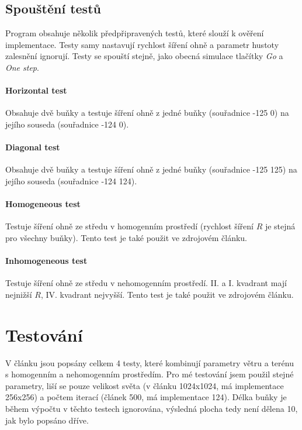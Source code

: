 \documentclass[11pt,a4paper]{scrartcl}
\begin{document}
	\subsection{Spouštění testů}
	Program obsahuje několik předpřipravených testů, které slouží k ověření implementace. Testy samy nastavují rychlost šíření ohně a parametr hustoty zalesnění ignorují. Testy se spouští stejně, jako obecná simulace tlačítky \textit{Go} a \textit{One step}.
	
	\paragraph{Horizontal test}
	Obsahuje dvě buňky a testuje šíření ohně z jedné buňky (souřadnice -125 0) na jejího souseda (souřadnice -124 0).
	
	\paragraph{Diagonal test}
	Obsahuje dvě buňky a testuje šíření ohně z jedné buňky (souřadnice -125 125) na jejího souseda (souřadnice -124 124).
	
	\paragraph{Homogeneous test}
	Testuje šíření ohně ze středu v homogenním prostředí (rychlost šíření $R$ je stejná pro všechny buňky). Tento test je také použit ve zdrojovém článku.
	
	\paragraph{Inhomogeneous test}
	Testuje šíření ohně ze středu v nehomogenním prostředí. II. a I. kvadrant mají nejnižší $R$, IV. kvadrant nejvyšší. Tento test je také použit ve zdrojovém článku.
	
	\section{Testování}
	V článku \cite{source_article} jsou popsány celkem 4 testy, které kombinují parametry větru a terénu s homogenním a nehomogenním prostředím. Pro mé testování jsem použil stejné parametry, liší se pouze velikost světa (v článku 1024x1024, má implementace 256x256) a počtem iterací (článek 500, má implementace 124). Délka buňky je během výpočtu v těchto testech ignorována, výsledná plocha tedy není dělena 10, jak bylo popsáno dříve.
	
\end{document}
